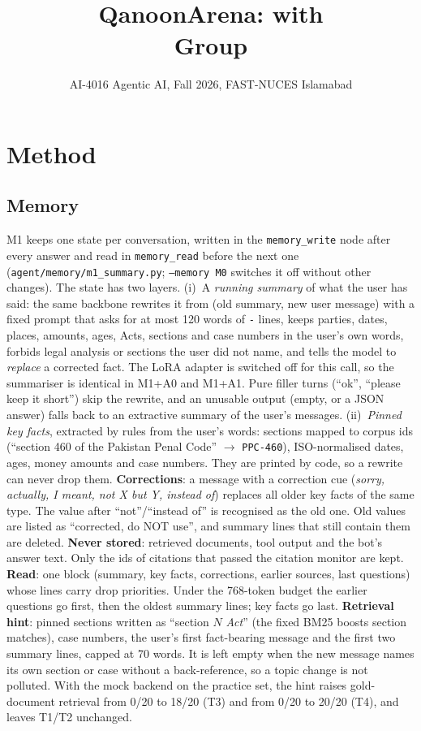 \documentclass[11pt]{article}
\title{QanoonArena: \memtype{} with \traintype{}\\[2pt]\large Group \groupid{}}
\author{\members}
\date{AI-4016 Agentic AI, Fall 2026, FAST-NUCES Islamabad}
\newcommand{\groupid}{G34}
\begin{document}
\maketitle

\section{Method}
\label{sec:\groupid-method}

\subsection{Memory}
M1 keeps one state per conversation, written in the \texttt{memory\_write} node after every answer and
read in \texttt{memory\_read} before the next one (\texttt{agent/memory/m1\_summary.py}; \texttt{--memory M0}
switches it off without other changes). The state has two layers.
(i)~A \emph{running summary} of what the user has said: the same backbone rewrites it from
(old summary, new user message) with a fixed prompt that asks for at most 120 words of \texttt{-} lines,
keeps parties, dates, places, amounts, ages, Acts, sections and case numbers in the user's own words,
forbids legal analysis or sections the user did not name, and tells the model to \emph{replace} a
corrected fact. The LoRA adapter is switched off for this call, so the summariser is identical in
M1+A0 and M1+A1. Pure filler turns (``ok'', ``please keep it short'') skip the rewrite, and an
unusable output (empty, or a JSON answer) falls back to an extractive summary of the user's messages.
(ii)~\emph{Pinned key facts}, extracted by rules from the user's words: sections mapped to corpus ids
(``section 460 of the Pakistan Penal Code'' $\rightarrow$ \texttt{PPC-460}), ISO-normalised dates, ages,
money amounts and case numbers. They are printed by code, so a rewrite can never drop them.
\textbf{Corrections}: a message with a correction cue (\emph{sorry, actually, I meant, not X but Y,
instead of}) replaces all older key facts of the same type. The value after ``not''/``instead of'' is
recognised as the old one. Old values are listed as ``corrected, do NOT use'', and summary lines that
still contain them are deleted.
\textbf{Never stored}: retrieved documents, tool output and the bot's answer text. Only the ids of
citations that passed the citation monitor are kept.
\textbf{Read}: one block (summary, key facts, corrections, earlier sources, last questions) whose
lines carry drop priorities. Under the 768-token budget the earlier questions go first, then the
oldest summary lines; key facts go last.
\textbf{Retrieval hint}: pinned sections written as ``section $N$ \emph{Act}'' (the fixed BM25 boosts
section matches), case numbers, the user's first fact-bearing message and the first two summary lines,
capped at 70 words. It is left empty when the new message names its own section or case without a
back-reference, so a topic change is not polluted. With the mock backend on the practice set, the
hint raises gold-document retrieval from 0/20 to 18/20 (T3) and from 0/20 to 20/20 (T4), and leaves
T1/T2 unchanged.
\end{document}
